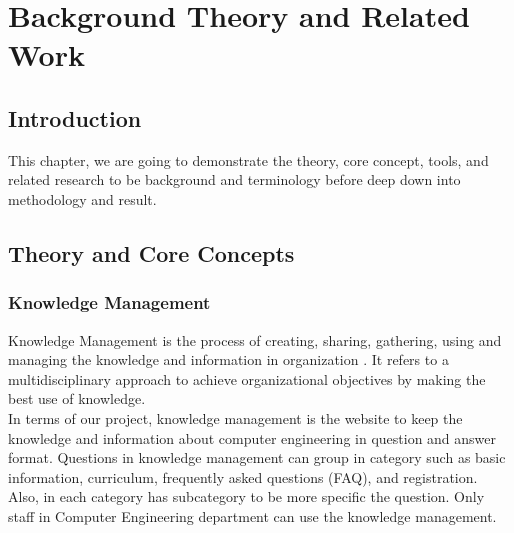 \documentclass[12pt,oneside,openright,a4paper]{cpe-english-project}
\begin{document}
\chapter{Background Theory and Related Work}

\section{Introduction}
This chapter, we are going to demonstrate the theory, core concept, tools, and related research to be background 
and terminology before deep down into methodology and result.

\section{Theory and Core Concepts}
\subsection{Knowledge Management}
Knowledge Management is the process of creating, sharing, gathering, using and managing the knowledge 
and information in organization \cite{what_is_km}. It refers to a multidisciplinary approach to achieve organizational 
objectives by making the best use of knowledge.\\
In terms of our project, knowledge management is the website to keep the knowledge and information about 
computer engineering in question and answer format. Questions in knowledge management can group in category 
such as basic information, curriculum, frequently asked questions (FAQ), and registration. Also, in each category 
has subcategory to be more specific the question. Only staff in Computer Engineering department can use the knowledge 
management.
 
\end{document}
